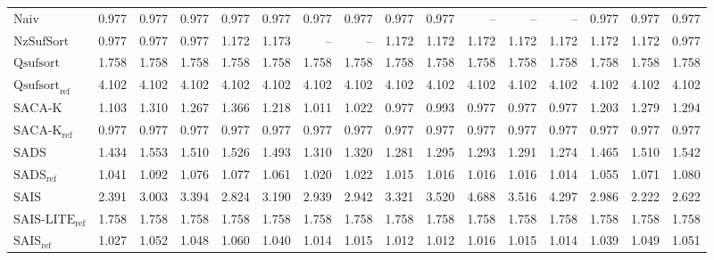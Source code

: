 \begin{table}
{\begin{tabular}{lrrrrrrrrrrrrrrr}
    $\text{Naiv}$ & {\color{green!60!black}0.977} & {\color{green!60!black}0.977} & {\color{green!60!black}0.977} & {\color{green!60!black}0.977} & {\color{green!60!black}0.977} & {\color{green!60!black}0.977} & {\color{green!60!black}0.977} & {\color{green!60!black}0.977} & {\color{green!60!black}0.977} & {\color{darkgray}--} & {\color{darkgray}--} & {\color{darkgray}--} & {\color{green!60!black}0.977} & {\color{green!60!black}0.977} & {\color{green!60!black}0.977} \\
    $\text{NzSufSort}$ & {\color{green!60!black}0.977} & {\color{green!60!black}0.977} & 0.977 & 1.172 & 1.173 & {\color{darkgray}--} & {\color{darkgray}--} & 1.172 & 1.172 & 1.172 & 1.172 & 1.172 & 1.172 & 1.172 & 0.977 \\
    $\text{Qsufsort}$ & 1.758 & 1.758 & 1.758 & 1.758 & 1.758 & 1.758 & 1.758 & 1.758 & 1.758 & 1.758 & 1.758 & 1.758 & 1.758 & 1.758 & 1.758 \\
    $\text{Qsufsort}_{\text{ref}}$ & 4.102 & 4.102 & 4.102 & 4.102 & 4.102 & 4.102 & 4.102 & 4.102 & 4.102 & 4.102 & 4.102 & 4.102 & 4.102 & 4.102 & 4.102 \\
    $\text{SACA-K}$ & 1.103 & 1.310 & 1.267 & 1.366 & 1.218 & 1.011 & 1.022 & 0.977 & 0.993 & {\color{green!60!black}0.977} & {\color{green!60!black}0.977} & {\color{green!60!black}0.977} & 1.203 & 1.279 & 1.294 \\
    $\text{SACA-K}_{\text{ref}}$ & {\color{green!60!black}0.977} & {\color{green!60!black}0.977} & {\color{green!60!black}0.977} & {\color{green!60!black}0.977} & {\color{green!60!black}0.977} & {\color{green!60!black}0.977} & {\color{green!60!black}0.977} & {\color{green!60!black}0.977} & {\color{green!60!black}0.977} & {\color{green!60!black}0.977} & {\color{green!60!black}0.977} & {\color{green!60!black}0.977} & {\color{green!60!black}0.977} & {\color{green!60!black}0.977} & {\color{green!60!black}0.977} \\
    $\text{SADS}$ & 1.434 & 1.553 & 1.510 & 1.526 & 1.493 & 1.310 & 1.320 & 1.281 & 1.295 & 1.293 & 1.291 & 1.274 & 1.465 & 1.510 & 1.542 \\
    $\text{SADS}_{\text{ref}}$ & 1.041 & 1.092 & 1.076 & 1.077 & 1.061 & 1.020 & 1.022 & 1.015 & 1.016 & 1.016 & 1.016 & 1.014 & 1.055 & 1.071 & 1.080 \\
    $\text{SAIS}$ & 2.391 & 3.003 & 3.394 & 2.824 & 3.190 & 2.939 & 2.942 & 3.321 & 3.520 & {\color{red}4.688} & 3.516 & 4.297 & 2.986 & 2.222 & 2.622 \\
    $\text{SAIS-LITE}_{\text{ref}}$ & 1.758 & 1.758 & 1.758 & 1.758 & 1.758 & 1.758 & 1.758 & 1.758 & 1.758 & 1.758 & 1.758 & 1.758 & 1.758 & 1.758 & 1.758 \\
    $\text{SAIS}_{\text{ref}}$ & 1.027 & 1.052 & 1.048 & 1.060 & 1.040 & 1.014 & 1.015 & 1.012 & 1.012 & 1.016 & 1.015 & 1.014 & 1.039 & 1.049 & 1.051 \\
\bottomrule
\end{tabular}
}
\end{table}

